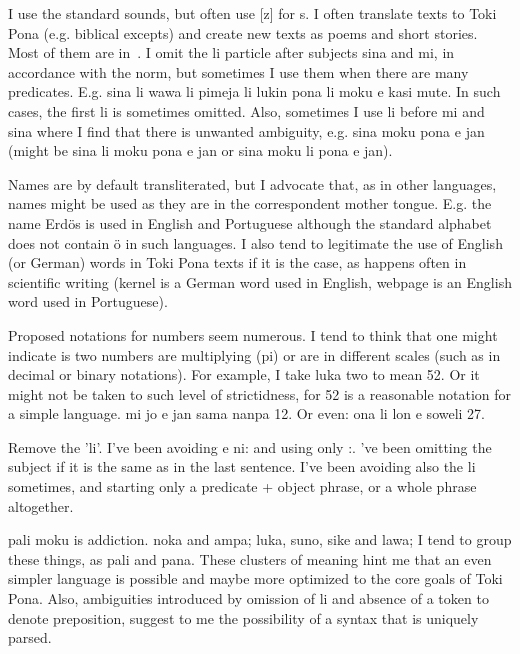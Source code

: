 \documentclass{article}
\begin{document}
I use the standard sounds, but often use [z] for s.
I often translate texts to Toki Pona (e.g. biblical excepts)
and create new texts as poems and short stories.
Most of them are in~\cite{tokisona}.
I omit the li particle after subjects sina and mi,
in accordance with the norm,
but sometimes I use them when there are many predicates.
E.g. sina li wawa li pimeja li lukin pona li moku e kasi mute.
In such cases, the first li is sometimes omitted.
Also, sometimes I use li before mi and sina where I find
that there is unwanted ambiguity, e.g.
sina moku pona e jan 
(might be sina li moku pona e jan or sina moku li pona e jan).

Names are by default transliterated,
but I advocate that, as in other languages,
names might be used as they are in the
correspondent mother tongue.
E.g. the name Erdös is used in
English and Portuguese although the standard
alphabet does not contain ö in such languages.
I also tend to legitimate the use of English (or German) words
in Toki Pona texts if it is the case,
as happens often in scientific writing
(kernel is a German word used in English,
webpage is an English word used in Portuguese).

Proposed notations for numbers seem numerous.
I tend to think that one might indicate is two numbers
are multiplying (pi) or are in different scales
(such as in decimal or binary notations).
For example, I take luka two to mean 52.
Or it might not be taken to such level of strictidness,
for 52 is a reasonable notation for a simple language.
mi jo e jan sama nanpa 12.
Or even:
ona li lon e soweli 27.

Remove the 'li'.
I've been avoiding e ni: and using only :.
've been omitting the subject if it is the
same as in the last sentence.
I've been avoiding also the li sometimes,
and starting only a predicate + object phrase,
or a whole phrase altogether.

pali moku is addiction.
noka and ampa; luka, suno, sike and lawa;
I tend to group these things, as pali and pana.
These clusters of meaning hint me that an even simpler
language is possible and maybe more optimized to the
core goals of Toki Pona.
Also, ambiguities introduced by omission of li
and absence of a token to denote preposition,
suggest to me the possibility of a syntax that is uniquely
parsed.
\end{document}
